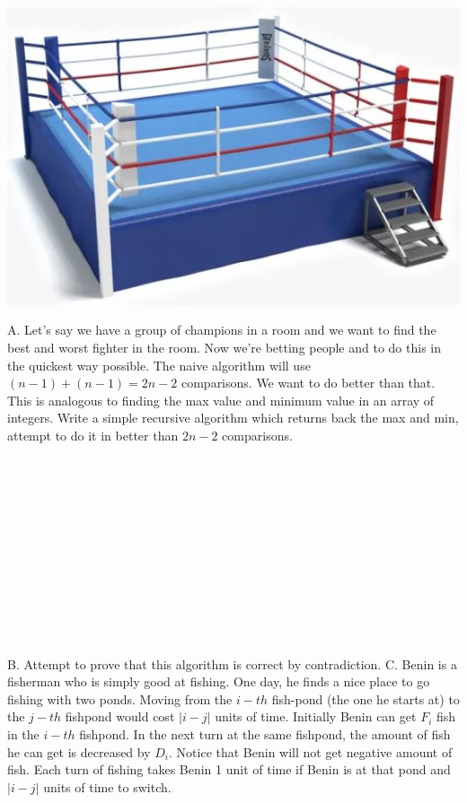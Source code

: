 \documentclass[12pt]{article}
\begin{document}
\newpage
\centerline{\includegraphics[scale = 0.25]{boxing.jpg}}
\noindent A. Let's say we have a group of champions in a room and we want to find the best and worst fighter in the room. Now we're betting people and to do this in the quickest way possible. The naive algorithm will use $(n-1) + (n-1) = 2n -2 $ comparisons. We want to do better than that. This is analogous to finding the max value and minimum value in an array of integers. Write a simple recursive algorithm which returns back the max and min, attempt to do it in better than $2n-2$ comparisons.\\\\\\\\\\\\\\\\\\\\\\\\\\
\noindent B. Attempt to prove that this algorithm is correct by contradiction. 
\newpage
\noindent C. Benin is a fisherman who is simply good at fishing. One day, he finds a nice place to go fishing with two ponds. 
Moving from the $i-th$ fish-pond (the one he starts at) to the $j-th$ fishpond would cost $|i - j|$ units of time. 
Initially Benin can get $F_i$ fish in the $i-th$ fishpond. 
In the next turn at the same fishpond, the amount of fish he can get is decreased by $D_i$. 
Notice that Benin will not get negative amount of fish.
Each turn of fishing takes Benin 1 unit of time if Benin is at that pond and $|i - j|$ units of time to switch.
\\\\
\end{document}
